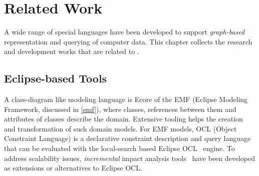 \chapter{Related Work}
\label{chap:related-work}

A wide range of special languages have been developed to support \emph{graph-based} representation and querying of computer data. This chapter collects the research and development works that are related to \iqd{}.

\section{Eclipse-based Tools}

A class-diagram like modeling language is Ecore of the EMF (Eclipse Modeling Framework, discussed in \autoref{emf}), where classes, references between them and attributes of classes describe the domain. 
Extensive tooling helps the creation and transformation of such domain models. For EMF models, OCL (Object Constraint Language) is a declarative constraint description and query language that can be evaluated with the local-search based Eclipse OCL~\cite{EclipseOCL} engine. To address scalability issues, \emph{incremental} impact analysis tools~\cite{OCLIA} have been developed as extensions or alternatives to Eclipse OCL.


% 
% 

